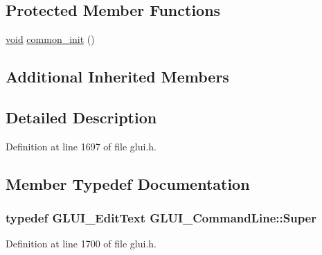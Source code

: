 \subsection*{Protected Member Functions}
\begin{DoxyCompactItemize}
\item 
\hyperlink{wglext_8h_a9e6b7f1933461ef318bb000d6bd13b83}{void} \hyperlink{class_g_l_u_i___command_line_a21eeafb7d6f3df4d3ddee365422894b6}{common\+\_\+init} ()
\end{DoxyCompactItemize}
\subsection*{Additional Inherited Members}


\subsection{Detailed Description}


Definition at line 1697 of file glui.\+h.



\subsection{Member Typedef Documentation}
\hypertarget{class_g_l_u_i___command_line_af9db00326863efa876cbb5c6b2d255b7}{
\subsubsection[{Super}]{\setlength{\rightskip}{0pt plus 5cm}typedef {\bf G\+L\+U\+I\+\_\+\+Edit\+Text} {\bf G\+L\+U\+I\+\_\+\+Command\+Line\+::\+Super}}}\label{class_g_l_u_i___command_line_af9db00326863efa876cbb5c6b2d255b7}


Definition at line 1700 of file glui.\+h.



